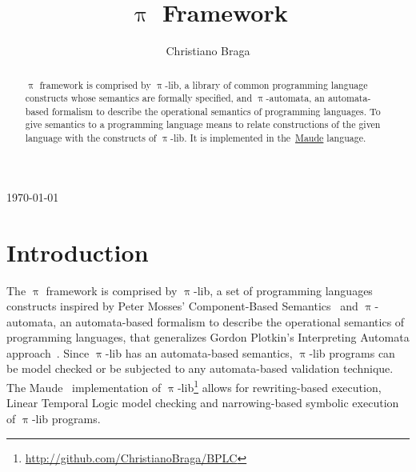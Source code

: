 \documentclass{llncs}%
\renewcommand{\date}{\today}
\begin{document}
        
\title{$\uppi$ Framework}
\author{Christiano Braga\\}

\maketitle

\begin{center}
\date
\end{center}



\begin{abstract}
$\uppi$ framework is comprised by $\uppi$-lib, a library of common programming language constructs whose semantics are formally specified, and $\uppi$-automata, an au\-to\-mata-based formalism to describe the operational semantics of programming languages.  To give semantics to a programming language means to relate constructions of the given language with the constructs of $\uppi$-lib. It is implemented in the~\href{http://maude.cs.uiuc.edu}{Maude} language.
\end{abstract}

\pagestyle{plain}

\section{Introduction}

The $\uppi$ framework is comprised by $\uppi$-lib, a set of programming languages constructs inspired by Peter Mosses' Component-Based Semantics~\cite{Mosses:2008:CDP:2227536.2227559} and $\uppi$-automata, an au\-to\-mata-based formalism to describe the operational semantics of programming languages, that generalizes Gordon Plotkin's Interpreting Automata approach~\cite{plotkin}.   
Since $\uppi$-lib has an automata-based semantics, $\uppi$-lib programs can be model checked or be subjected to any automata-based validation technique. The Maude~\cite{Clavel:2007:MHL:1808998} implementation of $\uppi$-lib\footnote{\url{http://github.com/ChristianoBraga/BPLC}} allows for rewriting-based execution, Linear Temporal Logic model checking and narrowing-based symbolic execution of $\uppi$-lib programs. 
\end{document}
